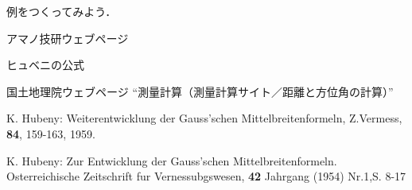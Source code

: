 \documentclass[11pt]{jarticle}
\begin{document}
\begin{example}
例をつくってみよう．
\end{example}

\begin{thebibliography}{4}

アマノ技研ウェブページ

ヒュベニの公式

国土地理院ウェブページ ``測量計算（測量計算サイト／距離と方位角の計算）''

K. Hubeny: 
\newblock Weiterentwicklung der Gauss'schen Mittelbreitenformeln, Z.Vermess, {\bf 84}, 159-163, 1959.

K. Hubeny: 
\newblock
Zur Entwicklung der Gauss'schen Mittelbreitenformeln. Osterreichische Zeitschrift fur Vernessubgswesen, {\bf 42} Jahrgang (1954) Nr.1,S. 8-17

\end{thebibliography}
\end{document}
